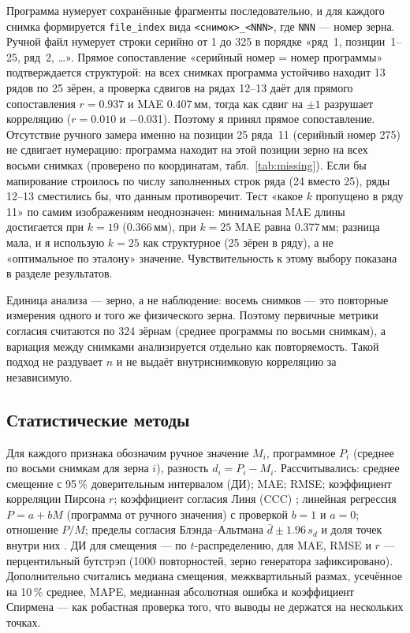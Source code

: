 \documentclass[12pt,a4paper]{article}
\begin{document}
Программа нумерует сохранённые фрагменты последовательно, и для каждого
снимка формируется \texttt{file\_index} вида
\texttt{<снимок>\_<NNN>}, где \texttt{NNN} — номер зерна. Ручной файл
нумерует строки серийно от 1 до 325 в порядке «ряд~1, позиции~1--25,
ряд~2, \ldots». Прямое сопоставление «серийный номер = номер программы»
подтверждается структурой: на всех снимках программа устойчиво находит
13 рядов по 25 зёрен, а проверка сдвигов на рядах 12--13 даёт для прямого
сопоставления $r = \num{0.937}$ и MAE \num{0.407}\,мм, тогда как сдвиг на
$\pm 1$ разрушает корреляцию ($r = \num{0.010}$ и \num{-0.031}). Поэтому
я принял прямое сопоставление. Отсутствие ручного замера именно на
позиции 25 ряда~11 (серийный номер 275) не сдвигает нумерацию: программа
находит на этой позиции зерно на всех восьми снимках (проверено по
координатам, табл.~\ref{tab:missing}). Если бы мапирование строилось по
числу заполненных строк ряда (24 вместо 25), ряды 12--13 сместились бы,
что данным противоречит. Тест «какое $k$ пропущено в ряду 11» по самим
изображениям неоднозначен: минимальная MAE длины достигается при
$k = 19$ (\num{0.366}\,мм), при $k = 25$ MAE равна \num{0.377}\,мм;
разница мала, и я использую $k = 25$ как структурное (25 зёрен в ряду),
а не «оптимальное по эталону» значение. Чувствительность к этому выбору
показана в разделе результатов.

\begin{table}[htbp]
\centering\small
\setlength{\tabcolsep}{4pt}
\caption{Зерно 275 (ряд~11, позиция~25): программа находит его на всех
восьми снимках, но ручного замера для него нет.}
\label{tab:missing}

\end{table}

Единица анализа — зерно, а не наблюдение: восемь снимков — это
повторные измерения одного и того же физического зерна. Поэтому
первичные метрики согласия считаются по 324 зёрнам (среднее программы
по восьми снимкам), а вариация между снимками анализируется отдельно
как повторяемость. Такой подход не раздувает $n$ и не выдаёт
внутриснимковую корреляцию за независимую.

\subsection{Статистические методы}

Для каждого признака обозначим ручное значение $M_i$, программное
$P_i$ (среднее по восьми снимкам для зерна $i$), разность
$d_i = P_i - M_i$. Рассчитывались: среднее смещение с 95\,\% доверительным
интервалом (ДИ); MAE; RMSE; коэффициент корреляции Пирсона $r$;
коэффициент согласия Линя (CCC) \cite{lin1989}; линейная регрессия
$P = a + bM$ (программа от ручного значения) с проверкой $b = 1$ и
$a = 0$; отношение $P/M$; пределы согласия Блэнда--Альтмана
$\bar d \pm 1.96\,s_d$ и доля точек внутри них \cite{bland1986}.
ДИ для смещения — по $t$-распределению, для MAE, RMSE и $r$ —
перцентильный бутстрэп (1000 повторностей, зерно генератора
зафиксировано). Дополнительно считались медиана смещения, межквартильный
размах, усечённое на 10\,\% среднее, MAPE, медианная абсолютная ошибка
и коэффициент Спирмена — как робастная проверка того, что выводы не
держатся на нескольких точках.
\end{document}

